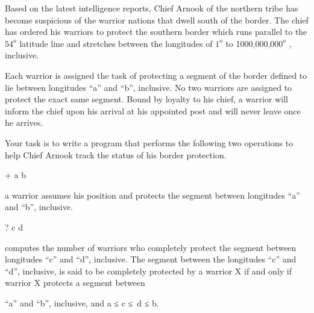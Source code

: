 Based on the latest intelligence reports, Chief Arnook of the northern tribe has become suspicious of the warrior nations that dwell south of the border. The chief has ordered his warriors to protect the southern border which runs parallel to the $54^{o}$     latitude line and stretches between the longitudes of $1^{o}$     to 1000,000,$000^{o}$     , inclusive.    

     Each warrior is assigned the task of protecting a segment of the border defined to lie between longitudes “a” and “b”, inclusive. No two warriors are assigned to protect the exact same segment. Bound by loyalty to his chief, a warrior will inform the chief upon his arrival at his appointed post and will never leave once he arrives.    

         Your task is to write a program that performs the following two operations                   to help Chief Arnook track the status of his border protection.         



        + a b       

        a warrior assumes his position and protects the segment between longitudes “a” and “b”, inclusive.       



        ? c d       

           computes the number of warriors who completely protect the segment between longitudes “c” and “d”, inclusive. The segment between the longitudes “c” and “d”, inclusive, is said to be completely protected by a warrior X if and only if warrior X protects a segment between          

            “a” and “b”, inclusive, and a ≤ c ≤ d ≤ b.